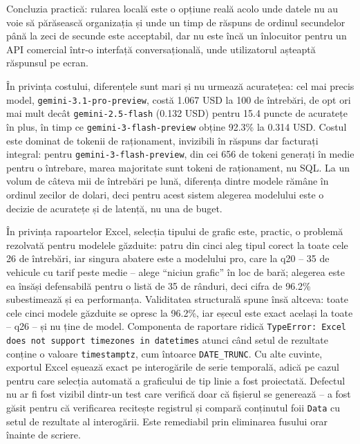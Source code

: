 \documentclass[12pt, a4paper]{report}
\newcommand{\code}[1]{\texttt{#1}}
\begin{document}
Concluzia practică: rularea locală este o opțiune reală acolo unde datele nu au
voie să părăsească organizația și unde un timp de răspuns de ordinul secundelor
până la zeci de secunde este acceptabil, dar nu este încă un înlocuitor pentru
un API comercial într-o interfață conversațională, unde utilizatorul așteaptă
răspunsul pe ecran.

În privința costului, diferențele sunt mari și nu urmează acuratețea:
cel mai precis model,
\code{gemini-3.1-pro-preview}, costă 1.067 USD la 100 de întrebări, de opt ori
mai mult decât \code{gemini-2.5-flash} (0.132 USD) pentru 15.4 puncte de
acuratețe în plus, în timp ce \code{gemini-3-flash-preview} obține 92.3\% la
0.314 USD. Costul este dominat de tokenii de raționament, invizibili în răspuns
dar facturați integral: pentru \code{gemini-3-flash-preview}, din cei 656 de
tokeni generați în medie pentru o întrebare, marea majoritate sunt tokeni de
raționament, nu SQL. La un volum de câteva mii de întrebări pe lună, diferența
dintre modele rămâne în ordinul zecilor de dolari, deci pentru acest sistem
alegerea modelului este o decizie de acuratețe și de latență, nu una de buget.

În privința rapoartelor Excel, selecția tipului de grafic este, practic, o
problemă rezolvată pentru modelele găzduite: patru din cinci
aleg tipul corect la toate cele 26 de întrebări, iar singura abatere
este a modelului pro, care la q20 -- 35 de vehicule cu tarif peste medie --
alege ``niciun grafic'' în loc de bară; alegerea este ea însăși defensabilă
pentru o listă de 35 de rânduri, deci cifra de 96.2\% subestimează și ea
performanța. Validitatea structurală spune însă altceva: toate cele cinci
modele găzduite se opresc la 96.2\%, iar eșecul este exact același la toate --
q26 -- și nu ține de model. Componenta de raportare ridică
\code{TypeError: Excel does not support timezones in datetimes} atunci când
setul de rezultate conține o valoare \code{timestamptz}, cum întoarce
\code{DATE\_TRUNC}. Cu alte cuvinte, exportul Excel eșuează exact pe interogările
de serie temporală, adică pe cazul pentru care selecția automată a graficului de
tip linie a fost proiectată. Defectul nu ar fi fost vizibil dintr-un test care
verifică doar că fișierul se generează -- a fost găsit pentru că verificarea
recitește registrul și compară conținutul foii \code{Data} cu setul de rezultate
al interogării. Este remediabil prin eliminarea fusului orar înainte de scriere.
\end{document}
